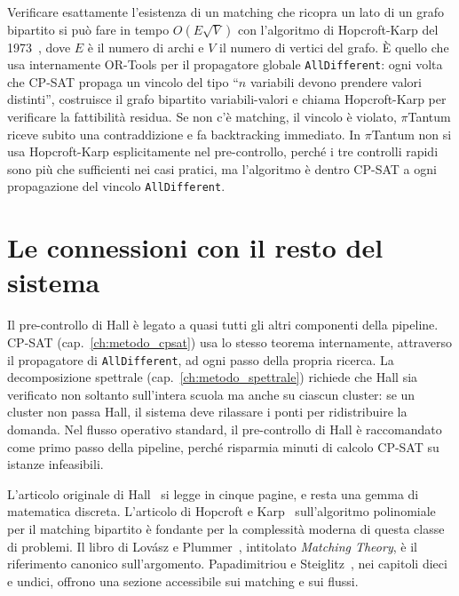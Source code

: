 \begin{approfondimentobox}
Verificare esattamente l'esistenza di un matching che
ricopra un lato di un grafo bipartito si pu\`o fare in
tempo $O(E \sqrt{V})$ con l'algoritmo di Hopcroft-Karp del
1973~\parencite{hopcroft1973}, dove $E$ \`e il numero di
archi e $V$ il numero di vertici del grafo. \`E quello che
usa internamente OR-Tools per il propagatore globale
\texttt{AllDifferent}: ogni volta che CP-SAT propaga un
vincolo del tipo ``$n$ variabili devono prendere valori
distinti'', costruisce il grafo bipartito variabili-valori e
chiama Hopcroft-Karp per verificare la fattibilit\`a
residua. Se non c'\`e matching, il vincolo \`e violato,
$\pi$Tantum riceve subito una contraddizione e fa
backtracking immediato. In $\pi$Tantum non si usa
Hopcroft-Karp esplicitamente nel pre-controllo, perch\'e i
tre controlli rapidi sono pi\`u che sufficienti nei casi
pratici, ma l'algoritmo \`e dentro CP-SAT a ogni
propagazione del vincolo \texttt{AllDifferent}.
\end{approfondimentobox}

\section{Le connessioni con il resto del sistema}

Il pre-controllo di Hall \`e legato a quasi tutti gli altri
componenti della pipeline. CP-SAT
(cap.~\ref{ch:metodo_cpsat}) usa lo stesso teorema
internamente, attraverso il propagatore di
\texttt{AllDifferent}, ad ogni passo della propria
ricerca. La decomposizione spettrale
(cap.~\ref{ch:metodo_spettrale}) richiede che Hall sia
verificato non soltanto sull'intera scuola ma anche su
ciascun cluster: se un cluster non passa Hall, il sistema
deve rilassare i ponti per ridistribuire la domanda. Nel
flusso operativo standard, il pre-controllo di Hall \`e
raccomandato come primo passo della pipeline, perch\'e
risparmia minuti di calcolo CP-SAT su istanze infeasibili.

\begin{biblioparvabox}
L'articolo originale di Hall~\parencite{hall1935} si legge
in cinque pagine, e resta una gemma di matematica
discreta. L'articolo di Hopcroft e
Karp~\parencite{hopcroft1973} sull'algoritmo polinomiale
per il matching bipartito \`e fondante per la complessit\`a
moderna di questa classe di problemi. Il libro di Lov\'asz e
Plummer~\parencite{lovasz1986}, intitolato \emph{Matching
Theory}, \`e il riferimento canonico sull'argomento.
Papadimitriou e Steiglitz~\parencite{papadimitriou1998},
nei capitoli dieci e undici, offrono una sezione accessibile
sui matching e sui flussi.
\end{biblioparvabox}
